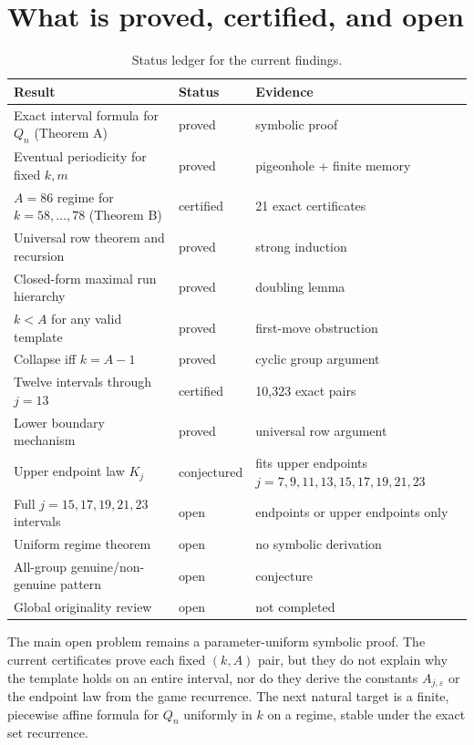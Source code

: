 \documentclass[11pt]{article}
\theoremstyle{remark}
\begin{document}
\section{What is proved, certified, and open}\label{sec:status}

\begin{table}[h]
\centering
\small
\caption{Status ledger for the current findings.}
\label{tab:status}
\begin{tabular}{p{}p{}p{}}
\toprule
Result & Status & Evidence\\
\midrule
Exact interval formula for \(Q_n\) (Theorem A) & proved & symbolic proof\\
Eventual periodicity for fixed \(k,m\) & proved & pigeonhole + finite memory\\
\(A=86\) regime for \(k=58,\dots,78\) (Theorem B) & certified & 21 exact certificates\\
Universal row theorem and recursion & proved & strong induction\\
Closed-form maximal run hierarchy & proved & doubling lemma\\
\(k<A\) for any valid template & proved & first-move obstruction\\
Collapse iff \(k=A-1\) & proved & cyclic group argument\\
Twelve intervals through \(j=13\) & certified & 10{,}323 exact pairs\\
Lower boundary mechanism & proved & universal row argument\\
Upper endpoint law \(K_j\) & conjectured & fits upper endpoints \(j=7,9,11,13,15,17,19,21,23\)\\
Full \(j=15,17,19,21,23\) intervals & open & endpoints or upper endpoints only\\
Uniform regime theorem & open & no symbolic derivation\\
All-group genuine/non-genuine pattern & open & conjecture\\
Global originality review & open & not completed\\
\bottomrule
\end{tabular}
\end{table}

The main open problem remains a parameter-uniform symbolic proof. The current certificates prove each fixed \((k,A)\) pair, but they do not explain why the template holds on an entire interval, nor do they derive the constants \(A_{j,\varepsilon}\) or the endpoint law from the game recurrence. The next natural target is a finite, piecewise affine formula for \(Q_n\) uniformly in \(k\) on a regime, stable under the exact set recurrence.
\end{document}
